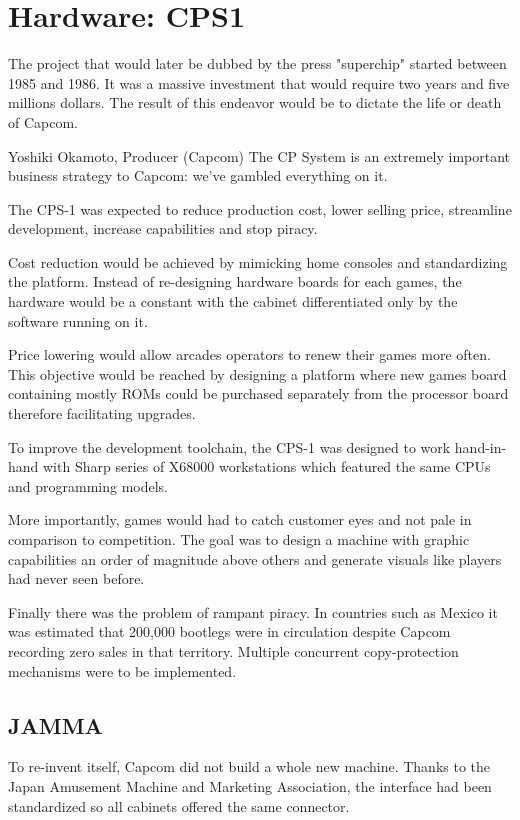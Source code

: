 \chapter{Hardware: CPS1}

The project that would later be dubbed by the press "superchip"\cite{tgm198906} started between 1985 and 1986. It was a massive investment that would require two years and five millions dollars. The result of this endeavor would be to dictate the life or death of Capcom.

\begin{q}{Yoshiki Okamoto, Producer (Capcom)\cite{gamest38}}
The CP System is an extremely important business strategy to Capcom: we’ve gambled everything on it.
\end{q}

The CPS-1 was expected to reduce production cost, lower selling price, streamline development, increase capabilities and stop piracy. 

Cost reduction would be achieved by mimicking home consoles and standardizing the platform. Instead of re-designing hardware boards for each games, the hardware would be a constant with the cabinet differentiated only by the software running on it.

Price lowering would allow arcades operators to renew their games more often. This objective would be reached by designing a platform where new games board containing mostly ROMs could be purchased separately from the processor board therefore facilitating upgrades.

To improve the development toolchain, the CPS-1 was designed to work hand-in-hand with Sharp series of X68000 workstations which featured the same CPUs and programming models.

More importantly, games would had to catch customer eyes and not pale in comparison to competition. The goal was to design a machine with graphic capabilities an order of magnitude above others and generate visuals like players had never seen before.

Finally there was the problem of rampant piracy. In countries such as Mexico it was estimated that 200,000 bootlegs were in circulation\cite{sf2_oral_history} despite Capcom recording zero sales in that territory. Multiple concurrent copy-protection mechanisms were to be implemented.


\section{JAMMA}
To re-invent itself, Capcom did not build a whole new machine. Thanks to the Japan Amusement Machine and Marketing Association, the interface had been standardized so all cabinets offered the same connector. 

